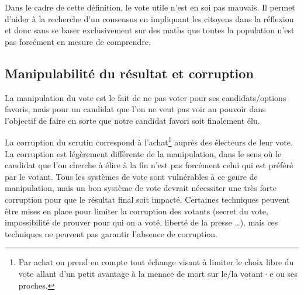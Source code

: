 \documentclass[../report]{subfiles}
\begin{document}
  Dans le cadre de cette définition, le vote utile n'est en soi pas mauvais.
  Il permet d'aider à la recherche d'un consensus en impliquant les citoyens dans la réflexion
  et donc sans se baser exclusivement sur des maths que toutes la population n'est pas forcément
  en mesure de comprendre.



  \subsection{Manipulabilité du résultat et corruption}%
  \label{diff:comp:util:manip}%
  \label{diff:comp:util:corruption}

  La manipulation du vote est le fait de ne pas voter pour ses candidats/options favoris, mais 
  pour un candidat que l'on ne veut pas voir au pouvoir dans l'objectif de faire en sorte que 
  notre candidat favori soit finalement élu.


  La corruption du scrutin correspond à l'achat\footnote{Par achat on prend en compte 
  tout échange visant à limiter le choix libre du vote allant d'un petit avantage à la menace 
  de mort sur le/la votant·e ou ses proches.} auprès des électeurs de leur vote.
  La corruption est légèrement différente de la manipulation, dans le sens où le candidat
  que l'on cherche à élire à la fin n'est pas forcément celui qui est préféré par le votant.
  Tous les systèmes de vote sont vulnérables à ce genre de manipulation, mais un bon système de 
  vote devrait nécessiter une très forte corruption pour que le résultat final soit impacté.
  Certaines techniques peuvent être mises en place pour limiter la corruption des votants (secret
  du vote, impossibilité de prouver pour qui on a voté, liberté de la presse …), mais 
  ces techniques ne peuvent pas garantir l'absence de corruption.
  
\end{document}
